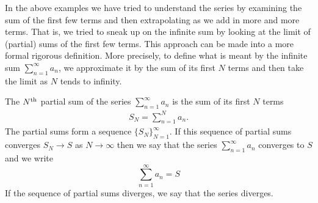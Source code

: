 In the above examples we have tried to understand the series by examining
the sum of the first few terms and then extrapolating as
we add in more and more terms. That is, we tried to sneak up on the
infinite sum by looking at the limit of (partial) sums of the first few terms. This approach can be made into a more formal rigorous definition.
More precisely, to define what is meant by the infinite sum
$\sum_{n=1}^\infty a_n$, we approximate it by the sum of its first
$N$ terms and then take the limit as $N$ tends to infinity.
\begin{defn}\label{def:SRseries}
The $N^{\rm th}$ partial sum of the series $\sum_{n=1}^\infty a_n$ is the sum of its first $N$ terms
\begin{align*}
S_N=\sum_{n=1}^N a_n.
\end{align*}
The partial sums form a sequence $\big\{S_N\big\}_{N=1}^\infty$.
If this sequence of partial sums converges $S_N \to S$ as
$N\rightarrow\infty$  then we say that the series $\sum_{n=1}^\infty a_n$
converges to $S$ and we write
\begin{equation*}
\sum_{n=1}^\infty a_n=S
\end{equation*}
If the sequence of partial sums diverges, we say that the series diverges.
\end{defn}



